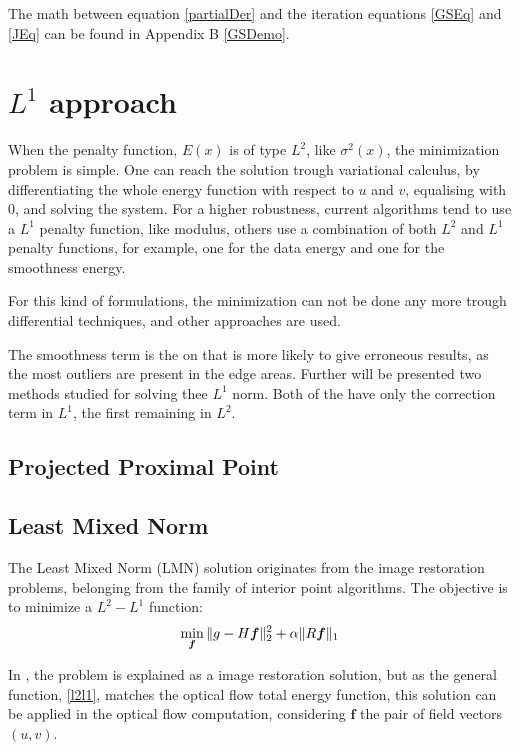 \documentclass[12pt,a4paper,twoside]{report}
\begin{document}
The math between equation \ref{partialDer} and the iteration equations \ref{GSEq} and \ref{JEq} can be found in Appendix B \ref{GSDemo}.


\section{$L^1$ approach}

When the penalty function, $E(x)$ is of type $L^2$, like $\sigma^2(x)$,  the minimization problem is simple. One can reach the solution trough variational calculus, by differentiating the whole energy function with respect to $u$ and $v$, equalising with 0, and solving the system.  
For a higher robustness, current algorithms tend to use a $L^1$ penalty function, like modulus, others use a combination of both $L^2$ and $L^1$ penalty functions, for example, one for the data energy and one for the smoothness energy.

For this kind of formulations, the minimization can not be done any more trough differential techniques, and other approaches are used.

The smoothness term is the on that is more likely to give erroneous results, as the most outliers are present in the edge areas. Further will be presented two methods studied for solving thee $L^1$ norm. Both of the have only the correction term in $L^1$, the first remaining in $L^2$.

\subsection{Projected Proximal Point}


\subsection{Least Mixed Norm}
The Least Mixed Norm (LMN) solution originates from the image restoration problems, belonging from the family of interior point algorithms. The objective is to minimize a $L^2-L^1$ function:
\begin{equation} \label{l2l1}
	\min_{\boldsymbol{f}}\Arrowvert g - H\boldsymbol{f}\Arrowvert_2^2+ \alpha\Arrowvert R \boldsymbol{f}\Arrowvert_1
\end{equation}

In \cite{fu2006efficient}, the problem is explained as a image restoration solution, but as the general function, \ref{l2l1}, matches the optical flow total energy function, this solution can be applied in the optical flow computation, considering $\boldsymbol{f}$ the pair of field vectors $(u,v)$.
\end{document}
